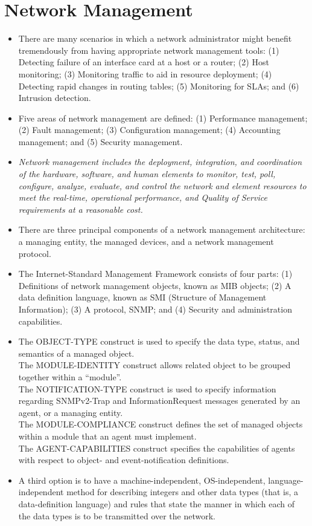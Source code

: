 \section{Network Management}
\begin{itemize}

\item
There are many scenarios in which a network administrator might benefit tremendously from having appropriate network management tools: (1) Detecting failure of an interface card at a host or a router; (2) Host monitoring; (3) Monitoring traffic to aid in resource deployment; (4) Detecting rapid changes in routing tables; (5) Monitoring for SLAs; and (6) Intrusion detection.

\item
Five areas of network management are defined: (1) Performance management; (2) Fault management; (3) Configuration management; (4) Accounting management; and (5) Security management.

\item
\textit{Network management includes the deployment, integration, and coordination of the hardware, software, and human elements to monitor, test, poll, configure, analyze, evaluate, and control the network and element resources to meet the real-time, operational performance, and Quality of Service requirements at a reasonable cost.}

\item
There are three principal components of a network management architecture: a managing entity, the managed devices, and a network management protocol.

\item
The Internet-Standard Management Framework consists of four parts: (1) Definitions of network management objects, known as MIB objects; (2) A data definition language, known as SMI (Structure of Management Information); (3) A protocol, SNMP; and (4) Security and administration capabilities.

\item
The OBJECT-TYPE construct is used to specify the data type, status, and semantics of a managed object.\\
The MODULE-IDENTITY construct allows related object to be grouped together within a ``module''.\\
The NOTIFICATION-TYPE construct is used to specify information regarding SNMPv2-Trap and InformationRequest messages generated by an agent, or a managing entity.\\
The MODULE-COMPLIANCE construct defines the set of managed objects within a module that an agent must implement.\\
The AGENT-CAPABILITIES construct specifies the capabilities of agents with respect to object- and event-notification definitions.

\item
A third option is to have a machine-independent, OS-independent, language-independent method for describing integers and other data types (that is, a data-definition language) and rules that state the manner in which each of the data types is to be transmitted over the network.

\end{itemize}